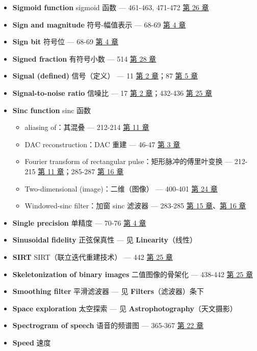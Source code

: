 \begin{itemize}
{  modulation}（幅度调制（调幅））
\item
  \textbf{Sigmoid function} sigmoid 函数 --- 461-463, 471-472 
  \hyperref[ch-26]{第 26 章}
\item
  \textbf{Sign and magnitude} 符号-幅值表示 --- 68-69 
  \hyperref[ch-04]{第 4 章}
\item
  \textbf{Sign bit} 符号位 --- 68-69  \hyperref[ch-04]{第 4
  章}
\item
  \textbf{Signed fraction} 有符号小数 --- 514 
  \hyperref[ch-28]{第 28 章}
\item
  \textbf{Signal (defined)} 信号（定义） --- 11 
  \hyperref[ch-02]{第 2 章}；87  \hyperref[ch-05]{第 5 章}
\item
  \textbf{Signal-to-noise ratio} 信噪比 --- 17 
  \hyperref[ch-02]{第 2 章}；432-436  \hyperref[ch-25]{第 25
  章}
\item
  \textbf{Sinc function} sinc 函数

  \begin{itemize}
  \tightlist
  \item
    aliasing of：其混叠 --- 212-214  \hyperref[ch-11]{第 11
    章}
  \item
    DAC reconstruction：DAC 重建 --- 46-47 
    \hyperref[ch-03]{第 3 章}
  \item
    Fourier transform of rectangular pulse：矩形脉冲的傅里叶变换 ---
    212-215  \hyperref[ch-11]{第 11 章}；285-287 
    \hyperref[ch-16]{第 16 章}
  \item
    Two-dimensional (image)：二维（图像） --- 400-401 
    \hyperref[ch-24]{第 24 章}
  \item
    Windowed-sinc filter：加窗 sinc 滤波器 --- 283-285 
    \hyperref[ch-15]{第 15 章}、\hyperref[ch-16]{第 16 章}
  \end{itemize}
\item
  \textbf{Single precision} 单精度 --- 70-76 
  \hyperref[ch-04]{第 4 章}
\item
  \textbf{Sinusoidal fidelity} 正弦保真性 --- 见
  \textbf{Linearity}（线性）
\item
  \textbf{SIRT} SIRT（联立迭代重建技术） --- 442 
  \hyperref[ch-25]{第 25 章}
\item
  \textbf{Skeletonization of binary images} 二值图像的骨架化 --- 438-442
   \hyperref[ch-25]{第 25 章}
\item
  \textbf{Smoothing filter} 平滑滤波器 --- 见
  \textbf{Filters}（滤波器）条下
\item
  \textbf{Space exploration} 太空探索 --- 见
  \textbf{Astrophotography}（天文摄影）
\item
  \textbf{Spectrogram of speech} 语音的频谱图 --- 365-367 
  \hyperref[ch-22]{第 22 章}
\item
  \textbf{Speed} 速度


\end{itemize}
